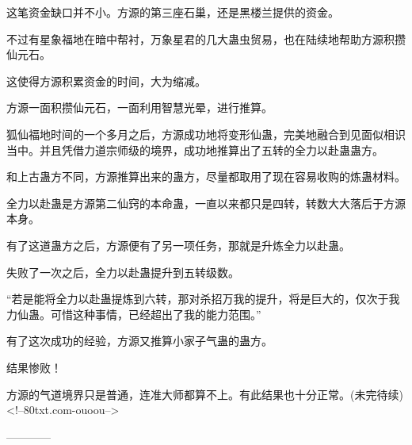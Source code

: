\begin{this_body}
这笔资金缺口并不小。方源的第三座石巢，还是黑楼兰提供的资金。

不过有星象福地在暗中帮衬，万象星君的几大蛊虫贸易，也在陆续地帮助方源积攒仙元石。

这使得方源积累资金的时间，大为缩减。

方源一面积攒仙元石，一面利用智慧光晕，进行推算。

狐仙福地时间的一个多月之后，方源成功地将变形仙蛊，完美地融合到见面似相识当中。并且凭借力道宗师级的境界，成功地推算出了五转的全力以赴蛊蛊方。

和上古蛊方不同，方源推算出来的蛊方，尽量都取用了现在容易收购的炼蛊材料。

全力以赴蛊是方源第二仙窍的本命蛊，一直以来都只是四转，转数大大落后于方源本身。

有了这道蛊方之后，方源便有了另一项任务，那就是升炼全力以赴蛊。

失败了一次之后，全力以赴蛊提升到五转级数。

“若是能将全力以赴蛊提炼到六转，那对杀招万我的提升，将是巨大的，仅次于我力仙蛊。可惜这种事情，已经超出了我的能力范围。”

有了这次成功的经验，方源又推算小家子气蛊的蛊方。

结果惨败！

方源的气道境界只是普通，连准大师都算不上。有此结果也十分正常。(未完待续)<!--80txt.com-ouoou-->

------------

\end{this_body}

